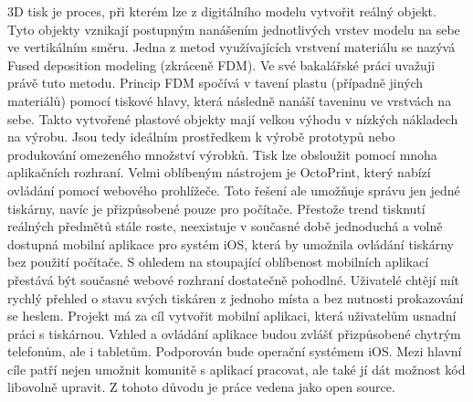 3D tisk je proces, při kterém lze z digitálního modelu vytvořit reálný objekt.
Tyto objekty vznikají postupným nanášením jednotlivých vrstev modelu na sebe ve vertikálním směru.
Jedna z metod využívajících vrstvení materiálu se nazývá Fused deposition modeling (zkráceně FDM).
Ve své bakalářské práci uvažuji právě tuto metodu.
Princip FDM spočívá v tavení plastu (případně jiných materiálů) pomocí tiskové hlavy, která následně nanáší taveninu ve vrstvách na sebe.
Takto vytvořené plastové objekty mají velkou výhodu v nízkých nákladech na výrobu.
Jsou tedy ideálním prostředkem k výrobě prototypů nebo produkování omezeného množství výrobků.
Tisk lze obsloužit pomocí mnoha aplikačních rozhraní.
Velmi oblíbeným nástrojem je OctoPrint, který nabízí ovládání pomocí webového prohlížeče.
Toto řešení ale umožňuje správu jen jedné tiskárny, navíc je přizpůsobené pouze pro počítače.
Přestože trend tisknutí reálných předmětů stále roste, neexistuje v současné době jednoduchá a volně dostupná mobilní aplikace pro systém iOS, která by umožnila ovládání tiskárny bez použití počítače.
S ohledem na stoupající oblíbenost mobilních aplikací přestává být současné webové rozhraní dostatečně pohodlné.
Uživatelé chtějí mít rychlý přehled o stavu svých tiskáren z jednoho místa a bez nutnosti prokazování se heslem.
Projekt má za cíl vytvořit mobilní aplikaci, která uživatelům usnadní práci s tiskárnou.
Vzhled a ovládání aplikace budou zvlášť přizpůsobené chytrým telefonům, ale i tabletům.
Podporován bude operační systémem iOS.
Mezi hlavní cíle patří nejen umožnit komunitě s aplikací pracovat, ale také jí dát možnost kód libovolně upravit.
Z tohoto důvodu je práce vedena jako open source.
